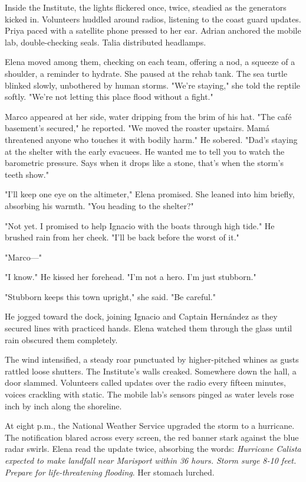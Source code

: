 Inside the Institute, the lights flickered once, twice, steadied as the generators kicked in. Volunteers huddled around radios, listening to the coast guard updates. Priya paced with a satellite phone pressed to her ear. Adrian anchored the mobile lab, double-checking seals. Talia distributed headlamps.

Elena moved among them, checking on each team, offering a nod, a squeeze of a shoulder, a reminder to hydrate. She paused at the rehab tank. The sea turtle blinked slowly, unbothered by human storms. "We're staying," she told the reptile softly. "We're not letting this place flood without a fight."

Marco appeared at her side, water dripping from the brim of his hat. "The café basement's secured," he reported. "We moved the roaster upstairs. Mamá threatened anyone who touches it with bodily harm." He sobered. "Dad's staying at the shelter with the early evacuees. He wanted me to tell you to watch the barometric pressure. Says when it drops like a stone, that's when the storm's teeth show."

"I'll keep one eye on the altimeter," Elena promised. She leaned into him briefly, absorbing his warmth. "You heading to the shelter?"

"Not yet. I promised to help Ignacio with the boats through high tide." He brushed rain from her cheek. "I'll be back before the worst of it."

"Marco—"

"I know." He kissed her forehead. "I'm not a hero. I'm just stubborn."

"Stubborn keeps this town upright," she said. "Be careful."

He jogged toward the dock, joining Ignacio and Captain Hernández as they secured lines with practiced hands. Elena watched them through the glass until rain obscured them completely.

The wind intensified, a steady roar punctuated by higher-pitched whines as gusts rattled loose shutters. The Institute's walls creaked. Somewhere down the hall, a door slammed. Volunteers called updates over the radio every fifteen minutes, voices crackling with static. The mobile lab's sensors pinged as water levels rose inch by inch along the shoreline.

At eight p.m., the National Weather Service upgraded the storm to a hurricane. The notification blared across every screen, the red banner stark against the blue radar swirls. Elena read the update twice, absorbing the words: \textit{Hurricane Calista expected to make landfall near Marisport within 36 hours. Storm surge 8-10 feet. Prepare for life-threatening flooding}. Her stomach lurched.

